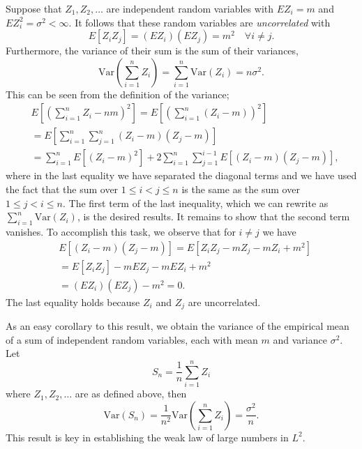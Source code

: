 Suppose that $Z_1, Z_2, \ldots$ are independent random variables with $E Z_i = m$ and $E Z_i^2 = \sigma^2 < \infty$.
It follows that these random variables are \emph{uncorrelated} with
\begin{equation*}
E [ Z_i Z_j ] = (E Z_i) (E Z_j) = m^2 \quad \forall i \neq j .
\end{equation*}
Furthermore, the variance of their sum is the sum of their variances,
\begin{equation*}
\mathrm{Var} \left( \sum_{i=1}^n Z_i \right)
= \sum_{i=1}^n \mathrm{Var} (Z_i)
= n \sigma^2 .
\end{equation*}
This can be seen from the definition of the variance;
\begin{equation*}
\begin{split}
&E \left[ \left( \sum_{i=1}^n Z_i - nm \right)^2 \right]
= E \left[ \left( \sum_{i=1}^n (Z_i - m) \right)^2 \right] \\
&= E \left[\sum_{i=1}^n \sum_{j=1}^n (Z_i - m) (Z_j - m) \right] \\
&= \sum_{i=1}^n E \left[ (Z_i - m)^2 \right]
+ 2 \sum_{i=1}^n \sum_{j=1}^{i-1} E [ (Z_i - m) (Z_j - m) ] ,
\end{split}
\end{equation*}
where in the last equality we have separated the diagonal terms and we have used the fact that the sum over $1 \leq i < j \leq n$ is the same as the sum over $1 \leq j < i \leq n$.
The first term of the last inequality, which we can rewrite as $\sum_{i=1}^n \mathrm{Var} (Z_i)$, is the desired results.
It remains to show that the second term vanishes.
To accomplish this task, we observe that for $i \neq j$ we have
\begin{equation*}
\begin{split}
&E [ (Z_i - m) (Z_j - m) ]
= E [ Z_i Z_j - m Z_j - m Z_i + m^2 ] \\
&= E [ Z_i Z_j ] - m E Z_j - m E Z_i + m^2 \\
&= (E Z_i) (E Z_j) - m^2
= 0 .
\end{split}
\end{equation*}
The last equality holds because $Z_i$ and $Z_j$ are uncorrelated.

As an easy corollary to this result, we obtain the variance of the empirical mean of a sum of independent random variables, each with mean $m$ and variance $\sigma^2$.
Let
\begin{equation*}
S_n = \frac{1}{n} \sum_{i=1}^n Z_i
\end{equation*}
where $Z_1, Z_2, \ldots$ are as defined above, then
\begin{equation*}
\mathrm{Var}(S_n) = \frac{1}{n^2} \mathrm{Var} \left( \sum_{i=1}^n Z_i \right)
= \frac{\sigma^2}{n} .
\end{equation*}
This result is key in establishing the weak law of large numbers in $L^2$.

